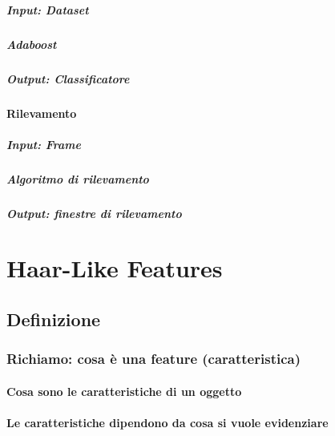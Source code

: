                 \paragraph{Input: Dataset}
                \paragraph{Adaboost}
                \paragraph{Output: Classificatore}
            \subsubsection{Rilevamento}
                \paragraph{Input: Frame}
                \paragraph{Algoritmo di rilevamento}
                \paragraph{Output: finestre di rilevamento}

\chapter{Haar-Like Features}
\label{chap:features}
    \section{Definizione}
    \label{sec:haar_features_definition}
        \subsection{Richiamo: cosa è una feature (caratteristica)}
            \subsubsection{Cosa sono le caratteristiche di un oggetto}
            \subsubsection{Le caratteristiche dipendono da cosa si vuole evidenziare}
